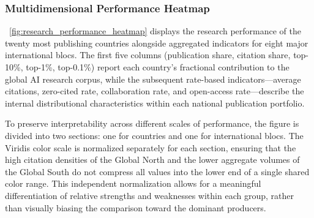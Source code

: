 \documentclass{article}
\begin{document}

\subsubsection{Multidimensional Performance Heatmap}

\figurename~\ref{fig:research_performance_heatmap} displays the research performance of the twenty most publishing countries alongside aggregated indicators for eight major international blocs. The first five columns (publication share, citation share, top-10\%, top-1\%, top-0.1\%) report each country’s fractional contribution to the global AI research corpus, while the subsequent rate-based indicators—average citations, zero-cited rate, collaboration rate, and open-access rate—describe the internal distributional characteristics within each national publication portfolio.

To preserve interpretability across different scales of performance, the figure is divided into two sections: one for countries and one for international blocs. The Viridis color scale is normalized separately for each section, ensuring that the high citation densities of the Global North and the lower aggregate volumes of the Global South do not compress all values into the lower end of a single shared color range. This independent normalization allows for a meaningful differentiation of relative strengths and weaknesses within each group, rather than visually biasing the comparison toward the dominant producers.
\end{document}
